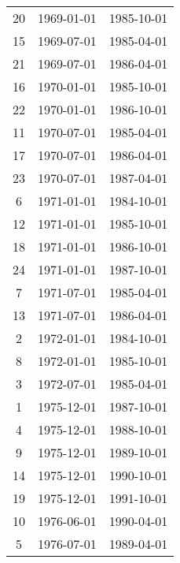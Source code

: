 % 
\begin{tabular}{ccc}
  \hline
  \hline
20 & 1969-01-01 & 1985-10-01 \\ 
  15 & 1969-07-01 & 1985-04-01 \\ 
  21 & 1969-07-01 & 1986-04-01 \\ 
  16 & 1970-01-01 & 1985-10-01 \\ 
  22 & 1970-01-01 & 1986-10-01 \\ 
  11 & 1970-07-01 & 1985-04-01 \\ 
  17 & 1970-07-01 & 1986-04-01 \\ 
  23 & 1970-07-01 & 1987-04-01 \\ 
  6 & 1971-01-01 & 1984-10-01 \\ 
  12 & 1971-01-01 & 1985-10-01 \\ 
  18 & 1971-01-01 & 1986-10-01 \\ 
  24 & 1971-01-01 & 1987-10-01 \\ 
  7 & 1971-07-01 & 1985-04-01 \\ 
  13 & 1971-07-01 & 1986-04-01 \\ 
  2 & 1972-01-01 & 1984-10-01 \\ 
  8 & 1972-01-01 & 1985-10-01 \\ 
  3 & 1972-07-01 & 1985-04-01 \\ 
  1 & 1975-12-01 & 1987-10-01 \\ 
  4 & 1975-12-01 & 1988-10-01 \\ 
  9 & 1975-12-01 & 1989-10-01 \\ 
  14 & 1975-12-01 & 1990-10-01 \\ 
  19 & 1975-12-01 & 1991-10-01 \\ 
  10 & 1976-06-01 & 1990-04-01 \\ 
  5 & 1976-07-01 & 1989-04-01 \\ 
   \hline
\end{tabular}
